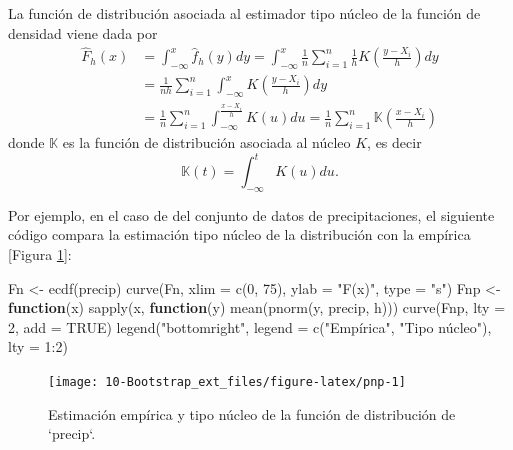 \documentclass[
  10pt,
]{book}
\newenvironment{Shaded}{\begin{snugshade}}{\end{snugshade}}
\newcommand{\AttributeTok}[1]{\textcolor[rgb]{0.77,0.63,0.00}{#1}}
\newcommand{\ConstantTok}[1]{\textcolor[rgb]{0.00,0.00,0.00}{#1}}
\newcommand{\ControlFlowTok}[1]{\textcolor[rgb]{0.13,0.29,0.53}{\textbf{#1}}}
\newcommand{\DecValTok}[1]{\textcolor[rgb]{0.00,0.00,0.81}{#1}}
\newcommand{\FunctionTok}[1]{\textcolor[rgb]{0.00,0.00,0.00}{#1}}
\newcommand{\NormalTok}[1]{#1}
\newcommand{\OtherTok}[1]{\textcolor[rgb]{0.56,0.35,0.01}{#1}}
\newcommand{\SpecialCharTok}[1]{\textcolor[rgb]{0.00,0.00,0.00}{#1}}
\newcommand{\StringTok}[1]{\textcolor[rgb]{0.31,0.60,0.02}{#1}}
\theoremstyle{break}
\theoremstyle{nonumberplain}
\begin{document}
La función de distribución asociada al estimador tipo núcleo de la función de densidad viene dada por
\[\begin{aligned}
\hat{F}_{h}\left( x \right) &= \int_{-\infty }^{x}\hat{f}_{h}\left( y \right) dy
=\int_{-\infty }^{x}\frac{1}{n}\sum_{i=1}^{n}\frac{1}{h}
K\left( \frac{y-X_i}{h} \right) dy \\
&= \frac{1}{nh}\sum_{i=1}^{n}\int_{-\infty }^{x}
K\left( \frac{y-X_i}{h} \right) dy \\
&= \frac{1}{n}\sum_{i=1}^{n}\int_{-\infty }^{\frac{x-X_i}{h}}K\left( u \right) du
=\frac{1}{n}\sum_{i=1}^{n}\mathbb{K}\left( \frac{x-X_i}{h} \right)
\end{aligned}\]
donde \(\mathbb{K}\) es la función de distribución asociada al núcleo \(K\), es decir
\[\mathbb{K}\left( t \right) =\int_{-\infty }^{t}K\left(u \right) du.\]

Por ejemplo, en el caso de del conjunto de datos de precipitaciones, el siguiente código compara la estimación tipo núcleo de la distribución con la empírica {[}Figura \ref{fig:pnp}{]}:

\begin{Shaded}
\begin{Highlighting}[]
\NormalTok{Fn }\OtherTok{\textless{}{-}} \FunctionTok{ecdf}\NormalTok{(precip)}
\FunctionTok{curve}\NormalTok{(Fn, }\AttributeTok{xlim =} \FunctionTok{c}\NormalTok{(}\DecValTok{0}\NormalTok{, }\DecValTok{75}\NormalTok{), }\AttributeTok{ylab =} \StringTok{"F(x)"}\NormalTok{, }\AttributeTok{type =} \StringTok{"s"}\NormalTok{)}
\NormalTok{Fnp }\OtherTok{\textless{}{-}} \ControlFlowTok{function}\NormalTok{(x) }\FunctionTok{sapply}\NormalTok{(x, }\ControlFlowTok{function}\NormalTok{(y) }\FunctionTok{mean}\NormalTok{(}\FunctionTok{pnorm}\NormalTok{(y, precip, h)))}
\FunctionTok{curve}\NormalTok{(Fnp, }\AttributeTok{lty =} \DecValTok{2}\NormalTok{, }\AttributeTok{add =} \ConstantTok{TRUE}\NormalTok{) }
\FunctionTok{legend}\NormalTok{(}\StringTok{"bottomright"}\NormalTok{, }\AttributeTok{legend =} \FunctionTok{c}\NormalTok{(}\StringTok{"Empírica"}\NormalTok{, }\StringTok{"Tipo núcleo"}\NormalTok{), }\AttributeTok{lty =} \DecValTok{1}\SpecialCharTok{:}\DecValTok{2}\NormalTok{)}
\end{Highlighting}
\end{Shaded}

\begin{figure}[!htbp]

{\centering \texttt{[image: 10-Bootstrap\_ext\_files/figure-latex/pnp-1]} 

}

\caption{Estimación empírica y tipo núcleo de la función de distribución de `precip`. }\label{fig:pnp}
\end{figure}
\end{document}
